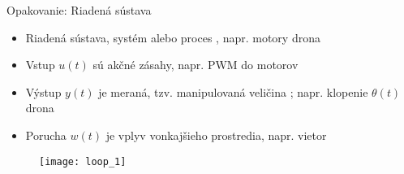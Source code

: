 %
%
%


%


\begin{frame}{Opakovanie: Riadená sústava}
  \begin{itemize}
    \item<1-> Riadená sústava, systém alebo proces , napr. motory drona
    \item<2-> Vstup $u(t)$  sú akčné zásahy, napr. PWM do motorov
    \item<3-> Výstup $y(t)$  je meraná, tzv. manipulovaná veličina ; napr. klopenie $\theta(t)$ drona
    \item<4-> Porucha  $w(t)$ je vplyv vonkajšieho prostredia, napr. vietor
  \end{itemize}

\begin{figure}
\centering
  \texttt{[image: loop\_1]}\\
\end{figure}
\end{frame}

